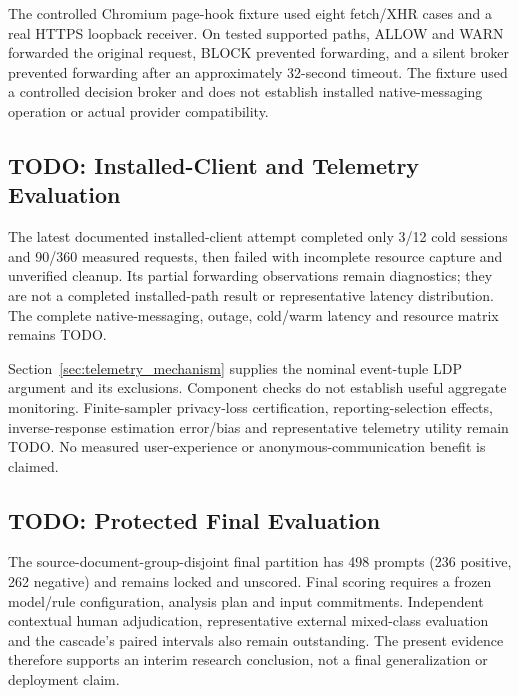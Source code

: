 \documentclass[conference]{IEEEtran}
\begin{document}
The controlled Chromium page-hook fixture used eight fetch/XHR cases and a real HTTPS loopback receiver. On tested supported paths, ALLOW and WARN forwarded the original request, BLOCK prevented forwarding, and a silent broker prevented forwarding after an approximately 32-second timeout. The fixture used a controlled decision broker and does not establish installed native-messaging operation or actual provider compatibility.

\subsection{TODO: Installed-Client and Telemetry Evaluation}

The latest documented installed-client attempt completed only 3/12 cold sessions and 90/360 measured requests, then failed with incomplete resource capture and unverified cleanup. Its partial forwarding observations remain diagnostics; they are not a completed installed-path result or representative latency distribution. The complete native-messaging, outage, cold/warm latency and resource matrix remains TODO.

Section~\ref{sec:telemetry_mechanism} supplies the nominal event-tuple LDP argument and its exclusions. Component checks do not establish useful aggregate monitoring. Finite-sampler privacy-loss certification, reporting-selection effects, inverse-response estimation error/bias and representative telemetry utility remain TODO. No measured user-experience or anonymous-communication benefit is claimed.

\subsection{TODO: Protected Final Evaluation}

The source-document-group-disjoint final partition has 498 prompts (236 positive, 262 negative) and remains locked and unscored. Final scoring requires a frozen model/rule configuration, analysis plan and input commitments. Independent contextual human adjudication, representative external mixed-class evaluation and the cascade's paired intervals also remain outstanding. The present evidence therefore supports an interim research conclusion, not a final generalization or deployment claim.

\end{document}
